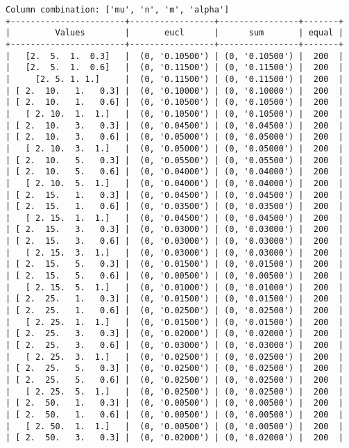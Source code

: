 \documentclass{article}
\begin{document}
\begin{verbatim}
Column combination: ['mu', 'n', 'm', 'alpha']
+-----------------------+-----------------+----------------+-------+
|         Values        |       eucl      |      sum       | equal |
+-----------------------+-----------------+----------------+-------+
|   [2.  5.  1.  0.3]   |  (0, '0.10500') | (0, '0.10500') |  200  |
|   [2.  5.  1.  0.6]   |  (0, '0.11500') | (0, '0.11500') |  200  |
|     [2. 5. 1. 1.]     |  (0, '0.11500') | (0, '0.11500') |  200  |
| [ 2.  10.   1.   0.3] |  (0, '0.10000') | (0, '0.10000') |  200  |
| [ 2.  10.   1.   0.6] |  (0, '0.10500') | (0, '0.10500') |  200  |
|   [ 2. 10.  1.  1.]   |  (0, '0.10500') | (0, '0.10500') |  200  |
| [ 2.  10.   3.   0.3] |  (0, '0.04500') | (0, '0.04500') |  200  |
| [ 2.  10.   3.   0.6] |  (0, '0.05000') | (0, '0.05000') |  200  |
|   [ 2. 10.  3.  1.]   |  (0, '0.05000') | (0, '0.05000') |  200  |
| [ 2.  10.   5.   0.3] |  (0, '0.05500') | (0, '0.05500') |  200  |
| [ 2.  10.   5.   0.6] |  (0, '0.04000') | (0, '0.04000') |  200  |
|   [ 2. 10.  5.  1.]   |  (0, '0.04000') | (0, '0.04000') |  200  |
| [ 2.  15.   1.   0.3] |  (0, '0.04500') | (0, '0.04500') |  200  |
| [ 2.  15.   1.   0.6] |  (0, '0.03500') | (0, '0.03500') |  200  |
|   [ 2. 15.  1.  1.]   |  (0, '0.04500') | (0, '0.04500') |  200  |
| [ 2.  15.   3.   0.3] |  (0, '0.03000') | (0, '0.03000') |  200  |
| [ 2.  15.   3.   0.6] |  (0, '0.03000') | (0, '0.03000') |  200  |
|   [ 2. 15.  3.  1.]   |  (0, '0.03000') | (0, '0.03000') |  200  |
| [ 2.  15.   5.   0.3] |  (0, '0.01500') | (0, '0.01500') |  200  |
| [ 2.  15.   5.   0.6] |  (0, '0.00500') | (0, '0.00500') |  200  |
|   [ 2. 15.  5.  1.]   |  (0, '0.01000') | (0, '0.01000') |  200  |
| [ 2.  25.   1.   0.3] |  (0, '0.01500') | (0, '0.01500') |  200  |
| [ 2.  25.   1.   0.6] |  (0, '0.02500') | (0, '0.02500') |  200  |
|   [ 2. 25.  1.  1.]   |  (0, '0.01500') | (0, '0.01500') |  200  |
| [ 2.  25.   3.   0.3] |  (0, '0.02000') | (0, '0.02000') |  200  |
| [ 2.  25.   3.   0.6] |  (0, '0.03000') | (0, '0.03000') |  200  |
|   [ 2. 25.  3.  1.]   |  (0, '0.02500') | (0, '0.02500') |  200  |
| [ 2.  25.   5.   0.3] |  (0, '0.02500') | (0, '0.02500') |  200  |
| [ 2.  25.   5.   0.6] |  (0, '0.02500') | (0, '0.02500') |  200  |
|   [ 2. 25.  5.  1.]   |  (0, '0.02500') | (0, '0.02500') |  200  |
| [ 2.  50.   1.   0.3] |  (0, '0.00500') | (0, '0.00500') |  200  |
| [ 2.  50.   1.   0.6] |  (0, '0.00500') | (0, '0.00500') |  200  |
|   [ 2. 50.  1.  1.]   |  (0, '0.00500') | (0, '0.00500') |  200  |
| [ 2.  50.   3.   0.3] |  (0, '0.02000') | (0, '0.02000') |  200  |

\end{verbatim}
\end{document}
